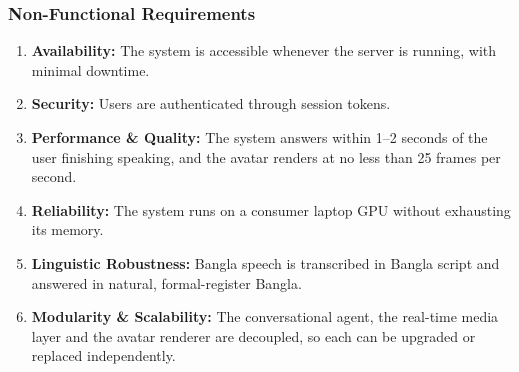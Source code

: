 \subsubsection{Non-Functional Requirements}

\begin{enumerate}
    \item \textbf{Availability:} The system is accessible whenever the server is running, with minimal downtime.

    \item \textbf{Security:} Users are authenticated through session tokens.

    \item \textbf{Performance \& Quality:} The system answers within 1--2 seconds of the user finishing speaking, and the avatar renders at no less than 25 frames per second.

    \item \textbf{Reliability:} The system runs on a consumer laptop GPU without exhausting its memory.

    \item \textbf{Linguistic Robustness:} Bangla speech is transcribed in Bangla script and answered in natural, formal-register Bangla.

    \item \textbf{Modularity \& Scalability:} The conversational agent, the real-time media layer and the avatar renderer are decoupled, so each can be upgraded or replaced independently.
\end{enumerate}


